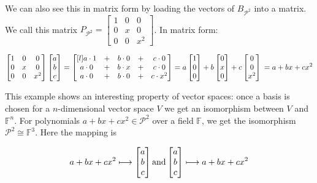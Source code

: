 \documentclass[11pt, oneside]{article}   	%
\begin{document}
\bigskip
\noindent
We can also see this in matrix form by loading the vectors of $B_{\mathcal{P}^2}$ into a matrix. We call this matrix
$P_{\mathcal{P}^2} = \begin{bmatrix} 1 & 0 & 0 \\ 0 & x & 0 \\ 0 & 0 & x^2 \end{bmatrix}$. In matrix form:

\bigskip
\begin{equation*}
\begin{bmatrix} 1 & 0 & 0 \\ 0 & x & 0 \\ 0 & 0 & x^2 \end{bmatrix} \begin{bmatrix} a \\ b \\ c \end{bmatrix} =
\begin{bmatrix} [l]
a \cdot 1 &+& b \cdot 0 &+& c \cdot 0 \\
a \cdot 0 &+& b \cdot x &+& c \cdot 0 \\
a \cdot 0 &+& b \cdot 0 &+& c \cdot x^2 
\end{bmatrix}
= a  \begin{bmatrix} 1 \\ 0 \\0 \end{bmatrix} + b \begin{bmatrix} 0 \\ x \\0 \end{bmatrix} + c \begin{bmatrix} 0 \\ 0 \\ x^2 \end{bmatrix} \\
= a +bx +cx^2 
\end{equation*}



\bigskip
\noindent
This example shows an interesting property of vector spaces: once a basis is chosen for a $n$-dimensional vector space $V$ we get an
isomorphism between $V$ and $\mathbb{F}^n$. For polynomials $a +bx +cx^2 \in \mathcal{P}^2$ over a field $\mathbb{F}$, we get the
isomorphism  $\mathcal{P}^2 \cong \mathbb{F}^3$. Here the mapping is

\bigskip
\begin{equation*}
 a +bx +cx^2 \longmapsto \begin{bmatrix} a \\ b \\ c \end{bmatrix} \text{and} \\
 \begin{bmatrix} a \\ b \\ c \end{bmatrix} \longmapsto a +bx +cx^2
\end{equation*}
\end{document}
